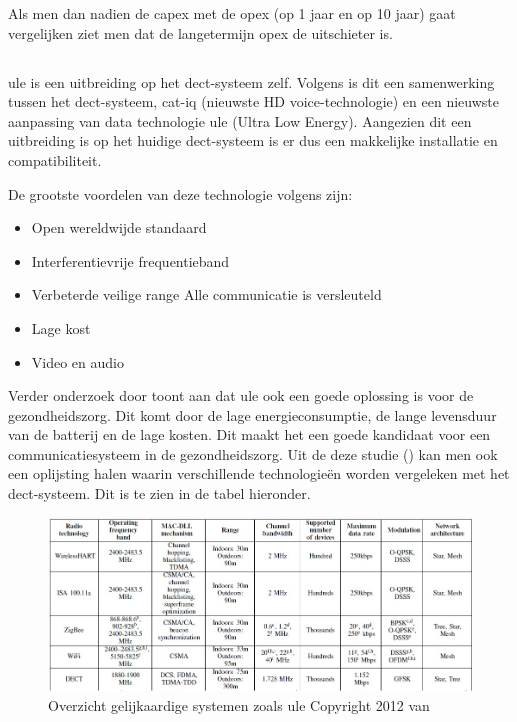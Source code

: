 Als men dan nadien de \gls{capex} met de \gls{opex} (op 1 jaar en op 10 jaar) gaat vergelijken ziet men dat de langetermijn \gls{opex} de uitschieter is. 

\subsection{}%
\label{sec:ule}%

\gls{ule} is een uitbreiding op het \gls{dect}-systeem zelf. Volgens \textcite{GariniDil2014} is dit een samenwerking tussen het \gls{dect}-systeem, \gls{cat-iq} (nieuwste HD voice-technologie) en een nieuwste aanpassing van data technologie \gls{ule} (Ultra Low Energy). Aangezien dit een uitbreiding is op het huidige \gls{dect}-systeem is er dus een makkelijke installatie en compatibiliteit.

De grootste voordelen van deze technologie volgens \textcite{GariniDil2014} zijn:

\begin{itemize}
  \item Open wereldwijde standaard
  \item Interferentievrije frequentieband
  \item Verbeterde veilige range
  \subitem Alle communicatie is versleuteld
  \item Lage kost
  \item Video en audio
\end{itemize}

Verder onderzoek door \textcite{Das2012} toont aan dat \gls{ule} ook een goede oplossing is voor de gezondheidszorg. Dit komt door de lage energieconsumptie, de lange levensduur van de batterij en de lage kosten. Dit maakt het een goede kandidaat voor een communicatiesysteem in de gezondheidszorg. Uit de deze studie (\textcite{Das2012}) kan men ook een oplijsting halen waarin verschillende technologieën worden vergeleken met het \gls{dect}-systeem. Dit is te zien in de tabel hieronder.

\begin{figure}[H]
  \includegraphics[width=\linewidth]{../graphics/overzicht.jpg}
  \caption{Overzicht gelijkaardige systemen zoals \gls{ule} \autocite[Door][]{Das2012} Copyright 2012 van \textcite{Das2012}}
  \label{fig:overzicht}
\end{figure}


